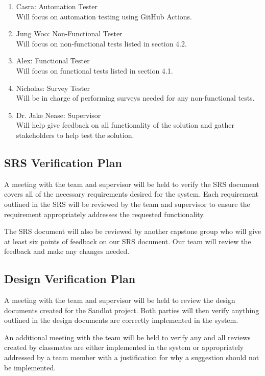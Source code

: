 \documentclass[12pt, titlepage]{article}
\begin{document}
\begin{enumerate}
  \item Casra: Automation Tester\\
  Will focus on automation testing using GitHub Actions.
  \item Jung Woo: Non-Functional Tester\\
  Will focus on non-functional tests listed in section 4.2.
  \item Alex: Functional Tester\\
  Will focus on functional tests listed in section 4.1.
  \item Nicholas: Survey Tester\\
  Will be in charge of performing surveys needed for any non-functional tests.
  \item Dr. Jake Nease: Supervisor\\
  Will help give feedback on all functionality of the solution and gather
  stakeholders to help test the solution.
\end{enumerate}

\subsection{SRS Verification Plan}

A meeting with the team and supervisor will be held to verify the SRS document covers all of
the necessary requirements desired for the system. Each requirement outlined in the SRS will
be reviewed by the team and supervisor to ensure the requirement appropriately addresses the
requested functionality.

The SRS document will also be reviewed by another capstone group who will give
at least six points of feedback on our SRS document. Our team will review the
feedback and make any changes needed.

\subsection{Design Verification Plan}

A meeting with the team and supervisor will be held to review the design documents created
for the Sandlot project. Both parties will then verify anything outlined in the design
documents are correctly implemented in the system.

An additional meeting with the team will be held to verify any and all reviews created by
classmates are either implemented in the system or appropriately addressed by a team member
with a justification for why a suggestion should not be implemented.
\end{document}
